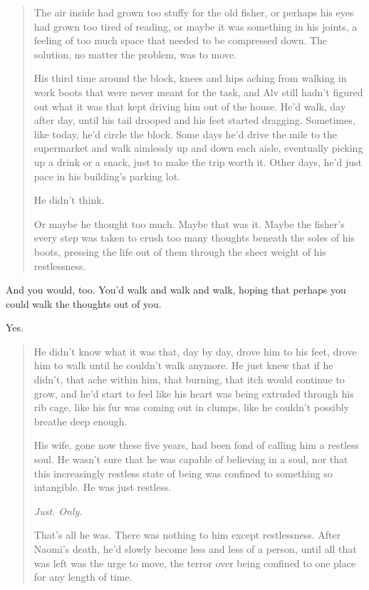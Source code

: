 \begin{paracol}{2}
\begin{leftcolumn}
\begin{quotation}
  \noindent The air inside had grown too stuffy for the old fisher, or perhaps his eyes had grown too tired of reading, or maybe it was something in his joints, a feeling of too much space that needed to be compressed down. The solution, no matter the problem, was to move.

  His third time around the block, knees and hips aching from walking in work boots that were never meant for the task, and Alv still hadn't figured out what it was that kept driving him out of the house. He'd walk, day after day, until his tail drooped and his feet started dragging. Sometimes, like today, he'd circle the block. Some days he'd drive the mile to the supermarket and walk aimlessly up and down each aisle, eventually picking up a drink or a snack, just to make the trip worth it. Other days, he'd just pace in his building's parking lot.

  He didn't think.

  Or maybe he thought too much. Maybe that was it. Maybe the fisher's every step was taken to crush too many thoughts beneath the soles of his boots, pressing the life out of them through the sheer weight of his restlessness.
\end{quotation}

\begin{ally}
And you would, too. You'd walk and walk and walk, hoping that perhaps you could walk the thoughts out of you.
\end{ally}
Yes.

\begin{quotation}
  \noindent He didn't know what it was that, day by day, drove him to his feet, drove him to walk until he couldn't walk anymore. He just knew that if he didn't, that ache within him, that burning, that itch would continue to grow, and he'd start to feel like his heart was being extruded through his rib cage, like his fur was coming out in clumps, like he couldn't possibly breathe deep enough.

  His wife, gone now these five years, had been fond of calling him a restless soul. He wasn't sure that he was capable of believing in a soul, nor that this increasingly restless state of being was confined to something so intangible. He was just restless.

  \emph{Just. Only.}

  That's all he was. There was nothing to him except restlessness. After Naomi's death, he'd slowly become less and less of a person, until all that was left was the urge to move, the terror over being confined to one place for any length of time.


\end{quotation}
\end{leftcolumn}
\end{paracol}

